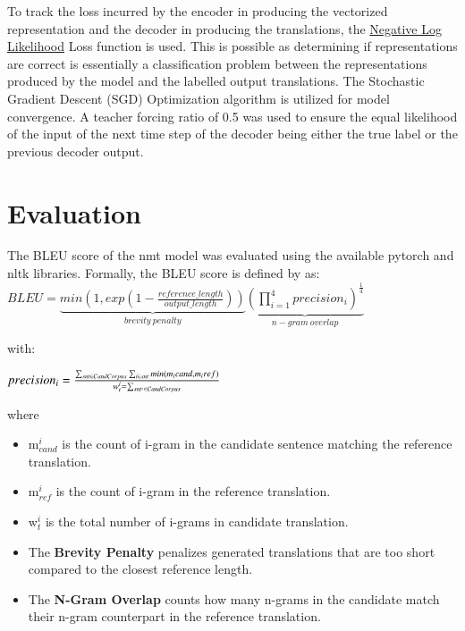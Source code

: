 \documentclass{sigchi}
\begin{document}
\par To track the loss incurred by the encoder in producing the vectorized representation and the decoder in producing the translations, the \href{https://pytorch.org/docs/stable/generated/torch.nn.NLLLoss.html}{Negative Log Likelihood} Loss function is used. This is possible as determining if representations are correct is essentially a classification problem between the representations produced by the model and the labelled output translations. The Stochastic Gradient Descent \cite{sgd} (SGD) Optimization algorithm is utilized for model convergence. A teacher forcing ratio of 0.5 was used to ensure the equal likelihood of the input of the next time step of the decoder being either the true label or the previous decoder output.


\section{Evaluation}
\par The BLEU score \cite{bleu} of the nmt model was evaluated using the available pytorch and nltk libraries.
Formally, the BLEU score is defined by \cite{googlebleu} as: \newline
\begin{math}
BLEU = \underbrace{min (1, exp(1 - \frac{reference\_length}{output\_length}))}_{brevity\ penalty} \underbrace{(\prod_{i = 1}^{4} precision_{i})^{\frac{1}{4}}}_{n-gram\ overlap}
\end{math}

with: \newline

\begin{math}
    precision_{i} = \frac{\sum_{snt \in Cand\-Corpus} \sum_{i \in snt} min (m_{i} cand, m_{i} ref)}{w_{t}^{i} = \sum_{snt^{,} \in Cand\-Corpus} }
\end{math}

where 

\begin{itemize}
  \item m$^{i}_{cand}$ is the count of i-gram in the candidate sentence matching the reference translation.
  
  \item m$^{i}_{ref}$ is the count of i-gram in the reference translation.
  
  \item w$^{i}_{t}$ is the total number of i-grams in candidate translation.
  
  \item The \textbf{Brevity Penalty} penalizes generated translations that are too short compared to the closest reference length.
  
  \item The \textbf{N-Gram Overlap} counts how many n-grams in the candidate match their n-gram counterpart in the reference translation.

\end{itemize}
\end{document}
